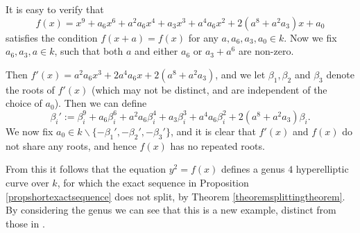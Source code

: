     \begin{ex}
    It is easy to verify that
        \begin{equation*}
        f(x) = x^9 + a_6x^6 + a^2a_6x^4 + a_3x^3 + a^4a_6x^2 + 2(a^8 + a^2a_3)x + a_0
        \end{equation*}
    satisfies the condition $f(x+a) = f(x)$ for any $a, a_6, a_3, a_0 \in k$.
    Now we fix $a_6, a_3, a \in k$, such that both $a$ and either $a_6$ or $a_3 + a^6$ are non-zero.


    Then $f'(x) = a^2a_6x^3 + 2a^4a_6x + 2(a^8 + a^2a_3)$, and we let $\beta_1, \beta_2$ and $\beta_3$ denote the roots of $f'(x)$ (which may not be distinct, and are independent of the choice of $a_0$).
    Then we can define
        \[
        \beta_i' :=\beta_i^9 + a_6\beta_i^6 + a^2a_6\beta_i^4 + a_3\beta_i^3 + a^4a_6\beta_i^2 + 2(a^8 + a^2a_3)\beta_i.
        \]
    We now fix $a_0 \in k \backslash \{-\beta_1', -\beta_2', -\beta_3'\}$, and it is clear that $f'(x)$ and $f(x)$ do not share any roots, and hence $f(x)$ has no repeated roots.


    From this it follows that the equation $y^2  = f(x)$ defines a genus $4$ hyperelliptic curve over $k$, for which the exact sequence in Proposition \ref{propshortexactsequence} does not split, by Theorem \ref{theoremsplittingtheorem}.
    By considering the genus we can see that this is a new example, distinct from those in \cite{canonicalrepresentation}.
    \end{ex}

